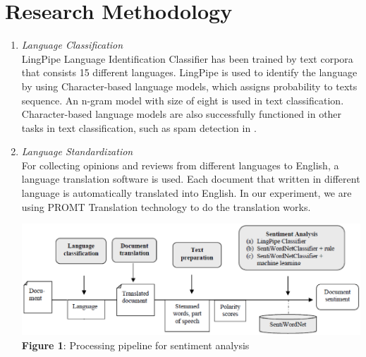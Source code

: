 \documentclass[a4papaer.12pt]{article}
\begin{document}
\pagebreak

\section*{\textbf{Research Methodology}}
\begin{enumerate}[I]
\item \textit{Language Classification}
\\
LingPipe Language Identification Classifier has been trained by text corpora that consists 15 different languages. LingPipe is used to identify the language by using Character-based language models, which assigns probability to texts sequence. An n-gram model with size of eight is used in text classification. Character-based language models are also successfully functioned in other tasks in text classification, such as spam detection in \cite{wilson2005recognizing}. 
\\
\item \textit{Language Standardization}
\\
For collecting opinions and reviews from different languages to English, a language translation software is used. Each document that written in different language is automatically translated into English. In our experiment, we are using PROMT Translation technology to do the translation works.
\\

\begin{center}
\includegraphics[scale=0.5]{Assignment2}
\\
\textbf{Figure 1}: Processing pipeline for sentiment analysis
\end{center}


\end{enumerate}
\end{document}
